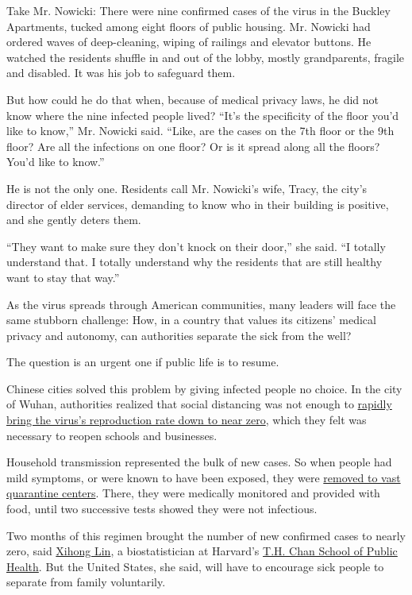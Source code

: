 Take Mr. Nowicki: There were nine confirmed cases of the virus in the
Buckley Apartments, tucked among eight floors of public housing. Mr.
Nowicki had ordered waves of deep-cleaning, wiping of railings and
elevator buttons. He watched the residents shuffle in and out of the
lobby, mostly grandparents, fragile and disabled. It was his job to
safeguard them.

But how could he do that when, because of medical privacy laws, he did
not know where the nine infected people lived? ``It's the specificity of
the floor you'd like to know,'' Mr. Nowicki said. ``Like, are the cases
on the 7th floor or the 9th floor? Are all the infections on one floor?
Or is it spread along all the floors? You'd like to know.''

He is not the only one. Residents call Mr. Nowicki's wife, Tracy, the
city's director of elder services, demanding to know who in their
building is positive, and she gently deters them.

``They want to make sure they don't knock on their door,'' she said. ``I
totally understand that. I totally understand why the residents that are
still healthy want to stay that way.''

As the virus spreads through American communities, many leaders will
face the same stubborn challenge: How, in a country that values its
citizens' medical privacy and autonomy, can authorities separate the
sick from the well?

The question is an urgent one if public life is to resume.

Chinese cities solved this problem by giving infected people no choice.
In the city of Wuhan, authorities realized that social distancing was
not enough to
\href{https://threader.app/thread/1251276061398220800}{rapidly bring the
virus's reproduction rate down to near zero}, which they felt was
necessary to reopen schools and businesses.

Household transmission represented the bulk of new cases. So when people
had mild symptoms, or were known to have been exposed, they were
\href{https://www.telegraph.co.uk/global-health/science-and-disease/isolate-isolate-isolate-chinas-approach-covid-19-quarantine/}{removed
to vast quarantine centers}. There, they were medically monitored and
provided with food, until two successive tests showed they were not
infectious.

Two months of this regimen brought the number of new confirmed cases to
nearly zero, said
\href{https://docs.google.com/presentation/d/1-rvZs0zsXF_0Tw8TNsBxKH4V1LQQXq7Az9kDfCgZDfE/edit\#slide=id.p1}{Xihong
Lin}, a biostatistician at Harvard's
\href{https://www.hsph.harvard.edu/xihong-lin/}{T.H. Chan School of
Public Health}. But the United States, she said, will have to encourage
sick people to separate from family voluntarily.

